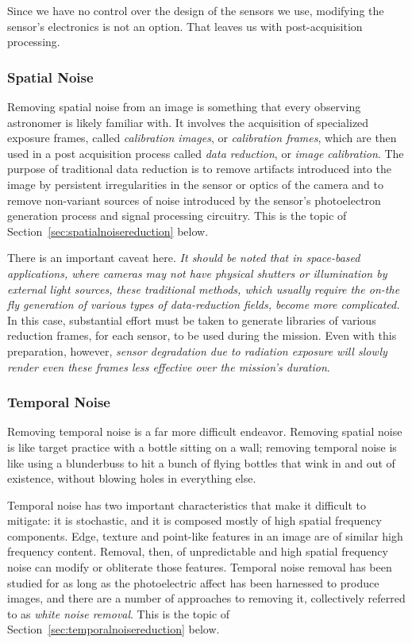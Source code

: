 \documentclass[10pt]{article}
\begin{document}
Since we have no control over the design of the sensors we use, modifying the sensor's electronics is not an option. That leaves us with post-acquisition processing. 

\subsubsection{Spatial Noise}

Removing spatial noise from an image is something that every observing astronomer is likely familiar with. It involves the acquisition of specialized exposure frames, called \emph{calibration images}, or \emph{calibration frames}, which are then used in a post acquisition process called \emph{data reduction}, or \emph{image calibration}. The purpose of traditional data reduction is to remove artifacts introduced into the image by persistent irregularities in the sensor or optics of the camera and to remove non-variant sources of noise introduced by the sensor's photoelectron generation process and signal processing circuitry. This is the topic of Section~\ref{sec:spatialnoisereduction} below.

There is an important caveat here. \emph{It should be noted that in space-based applications, where cameras may not have physical shutters or illumination by external light sources, these traditional methods, which usually require the on-the fly generation of various types of data-reduction fields, become more complicated.} In this case, substantial effort must be taken to generate libraries of various reduction frames, for each sensor, to be used during the mission. Even with this preparation, however, \emph{sensor degradation due to radiation exposure will slowly render even these frames less effective over the mission's duration}.

\subsubsection{Temporal Noise}

Removing temporal noise is a far more difficult endeavor. Removing spatial noise is like target practice with a bottle sitting on a wall; removing temporal noise is like using a blunderbuss to hit a bunch of flying bottles that wink in and out of existence, without blowing holes in everything else. 

Temporal noise has two important characteristics that make it difficult to mitigate: it is stochastic, and it is composed mostly of high spatial frequency components. Edge, texture and point-like features in an image are of similar high frequency content. Removal, then, of unpredictable and high spatial frequency noise can modify or obliterate those features. Temporal noise removal has been studied for as long as the photoelectric affect has been harnessed to produce images, and there are a number of approaches to removing it, collectively referred to as \emph{white noise removal}. This is the topic of Section~\ref{sec:temporalnoisereduction} below.
\end{document}
